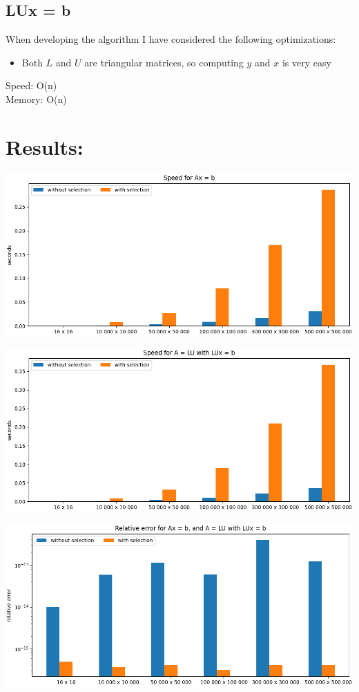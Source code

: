 \documentclass{article}
\begin{document}
\subsection*{LUx = b}
When developing the algorithm I have considered the following optimizations:
\begin{itemize}
    \item{Both $L$ and $U$ are triangular matrices, so computing $y$ and $x$ is very easy}
\end{itemize}
Speed: O(n)\\
Memory: O(n)
\newpage
\section*{Results:}
\begin{center}
    \includegraphics[scale=0.49]{Axb_Speed}
\end{center}
\begin{center}
    \includegraphics[scale=0.49]{LUxb_Speed}
\end{center}
\begin{center}
    \includegraphics[scale=0.49]{Relative_error}
\end{center}
\end{document}
